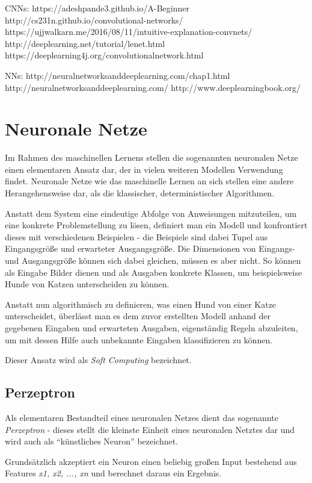 
CNNs:
https://adeshpande3.github.io/A-Beginner%
http://cs231n.github.io/convolutional-networks/
https://ujjwalkarn.me/2016/08/11/intuitive-explanation-convnets/
http://deeplearning.net/tutorial/lenet.html
https://deeplearning4j.org/convolutionalnetwork.html

NNs:
http://neuralnetworksanddeeplearning.com/chap1.html
http://neuralnetworksanddeeplearning.com/
http://www.deeplearningbook.org/



\section{Neuronale Netze}

Im Rahmen des maschinellen Lernens stellen die sogenannten neuronalen Netze einen elementaren Ansatz dar,
der in vielen weiteren Modellen Verwendung findet. Neuronale Netze wie das maschinelle Lernen an sich
stellen eine andere Herangehensweise dar, als die klassischer, deterministischer Algorithmen.

Anstatt dem System eine eindeutige Abfolge von Anweisungen mitzuteilen, um eine konkrete Problemstellung
zu lösen, definiert man ein Modell und konfrontiert dieses mit verschiedenen Beispielen - die Beispiele
sind dabei Tupel aus Eingangsgröße und erwarteter Ausgangsgröße. Die Dimensionen von Eingangs- und Ausgangsgröße
können sich dabei gleichen, müssen es aber nicht. So können als Eingabe Bilder dienen und als
Ausgaben konkrete Klassen, um beispielsweise Hunde von Katzen unterscheiden zu können.

Anstatt nun algorithmisch zu definieren, was einen Hund von einer Katze unterscheidet, überlässt man es dem zuvor
erstellten Modell anhand der gegebenen Eingaben und erwarteten Ausgaben, eigenständig Regeln abzuleiten, um mit
dessen Hilfe auch unbekannte Eingaben klassifizieren zu können.

Dieser Ansatz wird als \textit{Soft Computing} bezeichnet.

\subsection{Perzeptron}

Als elementaren Bestandteil eines neuronalen Netzes dient das sogenannte \textit{Perzeptron} - dieses stellt
die kleinste Einheit eines neuronalen Netztes dar und wird auch als ``künstliches Neuron'' bezeichnet.

Grundsätzlich akzeptiert ein Neuron einen beliebig großen Input bestehend aus Features \textit{x1, x2, ..., xn} und
berechnet daraus ein Ergebnis.

